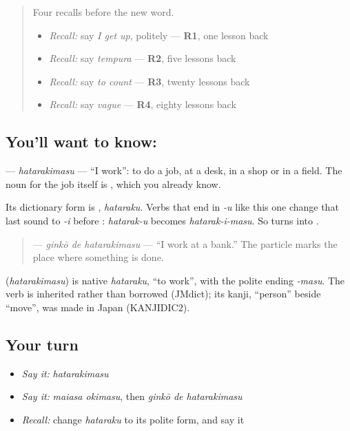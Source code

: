 \begin{quote}
Four recalls before the new word.

\begin{itemize}
\raggedright
  \item \emph{Recall:} say \emph{I get up}, politely — \textbf{R1}, one lesson back
  \item \emph{Recall:} say \emph{tempura} — \textbf{R2}, five lessons back
  \item \emph{Recall:} say \emph{to count} — \textbf{R3}, twenty lessons back
  \item \emph{Recall:} say \emph{vague} — \textbf{R4}, eighty lessons back
\end{itemize}
\end{quote}

\subsection*{You'll want to know: }
\textbf{} — \emph{hatarakimasu} — \textquotedblleft{}I work\textquotedblright{}: to do a job, at a desk, in a shop or in a field. The noun for the job itself is \textbf{}, which you already know.

Its dictionary form is \textbf{}, \emph{hataraku}. Verbs that end in \emph{-u} like this one change that last sound to \emph{-i} before \textbf{}: \emph{hatarak-u} becomes \emph{hatarak-i-masu}. So \textbf{} turns into \textbf{}.

\begin{quote}
\textbf{ } — \emph{ginkō de hatarakimasu} — \textquotedblleft{}I work at a bank.\textquotedblright{} The particle \textbf{} marks the place where something is done.
\end{quote}

\begin{cousinweb}
\textbf{} (\emph{hatarakimasu}) is native \emph{hataraku}, \textquotedblleft{}to work\textquotedblright{}, with the polite ending \emph{-masu}. The verb is inherited rather than borrowed (JMdict); its kanji, \textquotedblleft{}person\textquotedblright{} beside \textquotedblleft{}move\textquotedblright{}, was made in Japan (KANJIDIC2).
\end{cousinweb}

\subsection*{Your turn}
\begin{itemize}
\raggedright
  \item \emph{Say it:} \emph{hatarakimasu}
  \item \emph{Say it:} \emph{maiasa okimasu}, then \emph{ginkō de hatarakimasu}
  \item \emph{Recall:} change \emph{hataraku} to its polite form, and say it
\end{itemize}

